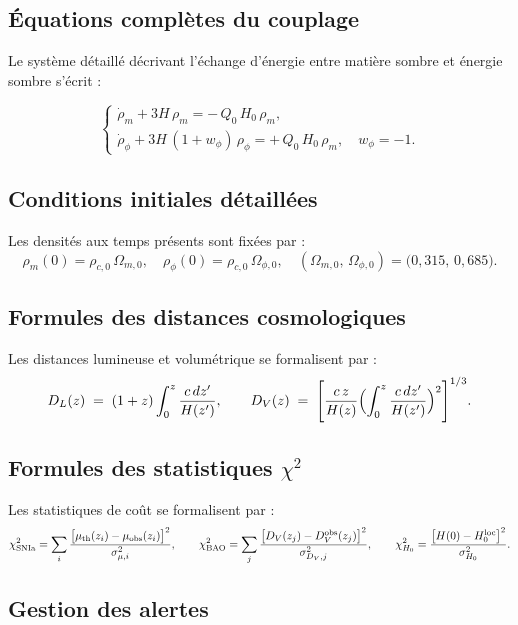 \subsection{Équations complètes du couplage}

Le système détaillé décrivant l’échange d’énergie entre matière sombre et énergie sombre s’écrit :

\[
  \begin{cases}
    \dot{\rho}_{m} + 3H\,\rho_{m}
      = -\,Q_{0}\,H_{0}\,\rho_{m},\\[6pt]
    \dot{\rho}_{\phi} + 3H\,(1 + w_{\phi})\,\rho_{\phi}
      = +\,Q_{0}\,H_{0}\,\rho_{m},
    \quad w_{\phi} = -1.
  \end{cases}
\]

\subsection{Conditions initiales détaillées}

Les densités aux temps présents sont fixées par :
\[
  \rho_{m}(0) = \rho_{c,0}\,\Omega_{m,0},
  \quad
  \rho_{\phi}(0) = \rho_{c,0}\,\Omega_{\phi,0},
  \quad
  (\Omega_{m,0},\,\Omega_{\phi,0}) = \bigl(0{,}315,\,0{,}685\bigr).
\]

\subsection{Formules des distances cosmologiques}

Les distances lumineuse et volumétrique se formalisent par :
\[
  D_{L}(z) \;=\; (1+z)\int_{0}^{z} \frac{c\,dz'}{H(z')},
  \qquad
  D_{V}(z) \;=\; \Biggl[\frac{c\,z}{H(z)}\Bigl(\int_{0}^{z}\frac{c\,dz'}{H(z')}\Bigr)^{2}\Biggr]^{1/3}.
\]

\subsection{Formules des statistiques \(\chi^{2}\)}

Les statistiques de coût se formalisent par :
\[
  \chi^{2}_{\rm SNIa}
  = \sum_{i}
    \frac{\bigl[\mu_{\rm th}(z_{i}) - \mu_{\rm obs}(z_{i})\bigr]^{2}}
         {\sigma_{\mu,i}^{2}},
  \qquad
  \chi^{2}_{\rm BAO}
  = \sum_{j}
    \frac{\bigl[D_{V}(z_{j}) - D_{V}^{\rm obs}(z_{j})\bigr]^{2}}
         {\sigma_{D_{V},j}^{2}},
  \qquad
  \chi^{2}_{H_{0}}
  = \frac{\bigl[H(0) - H_{0}^{\rm loc}\bigr]^{2}}
         {\sigma_{H_{0}}^{2}}.
\]

\subsection{Gestion des alertes}


